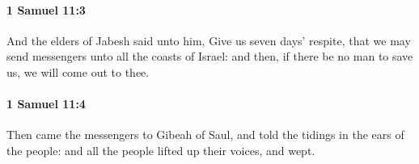 		\paragraph{1 Samuel 11:3} %
			\label{1SAMUEL-11-3}

			And the elders of Jabesh said unto him, Give us seven days’ respite, that we may send messengers unto all the coasts of Israel: and then, if there be no man to save us, we will come out to thee.


		\paragraph{1 Samuel 11:4} %
			\label{1SAMUEL-11-4}

			Then came the messengers to Gibeah of Saul, and told the tidings in the ears of the people: and all the people lifted up their voices, and wept.


